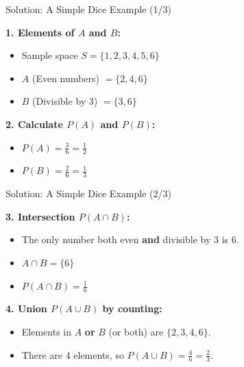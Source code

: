 \begin{frame}{Solution: A Simple Dice Example (1/3)}
    \begin{solution}
        \textbf{1. Elements of $A$ and $B$:}
        \begin{itemize}
            \item Sample space $S = \{1, 2, 3, 4, 5, 6\}$
            \item $A$ (Even numbers) $= \{2, 4, 6\}$
            \item $B$ (Divisible by 3) $= \{3, 6\}$
        \end{itemize}
        
        \pause \vspace{0.4cm}
        
        \textbf{2. Calculate $P(A)$ and $P(B)$:}
        \begin{itemize}
            \item $P(A) = \frac{3}{6} = \frac{1}{2}$
            \item $P(B) = \frac{2}{6} = \frac{1}{3}$
        \end{itemize}
    \end{solution}
\end{frame}

\begin{frame}{Solution: A Simple Dice Example (2/3)}
    \begin{solutioncont}
        \textbf{3. Intersection $P(A \cap B)$:}
        \begin{itemize}
            \item The only number both even \textbf{and} divisible by 3 is 6.
            \item $A \cap B = \{6\}$
            \item $P(A \cap B) = \frac{1}{6}$
        \end{itemize}

        \pause \vspace{0.4cm}

        \textbf{4. Union $P(A \cup B)$ by counting:}
        \begin{itemize}
            \item Elements in $A$ \textbf{or} $B$ (or both) are $\{2, 3, 4, 6\}$.
            \item There are 4 elements, so $P(A \cup B) = \frac{4}{6} = \frac{2}{3}$.
        \end{itemize}
   \end{solutioncont}
\end{frame}

